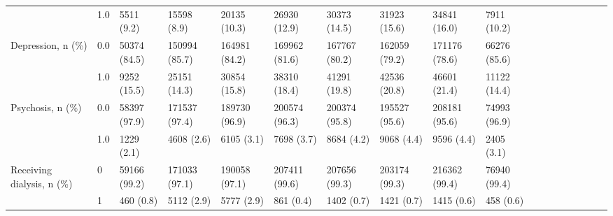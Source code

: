 \begin{tabular}{llllllllllllllllll}
                                       & 1.0 &                   5511 (9.2) &     15598 (8.9) &    20135 (10.3) &    26930 (12.9) &    30373 (14.5) &    31923 (15.6) &    34841 (16.0) &    7911 (10.2) &                   &                    &                    &                    &                    &                     &                     &                     \\
Depression, n (\%) & 0.0 &                 50374 (84.5) &   150994 (85.7) &   164981 (84.2) &   169962 (81.6) &   167767 (80.2) &   162059 (79.2) &   171176 (78.6) &   66276 (85.6) &                   &                    &                    &                    &                    &                     &                     &                     \\
                                       & 1.0 &                  9252 (15.5) &    25151 (14.3) &    30854 (15.8) &    38310 (18.4) &    41291 (19.8) &    42536 (20.8) &    46601 (21.4) &   11122 (14.4) &                   &                    &                    &                    &                    &                     &                     &                     \\
Psychosis, n (\%) & 0.0 &                 58397 (97.9) &   171537 (97.4) &   189730 (96.9) &   200574 (96.3) &   200374 (95.8) &   195527 (95.6) &   208181 (95.6) &   74993 (96.9) &                   &                    &                    &                    &                    &                     &                     &                     \\
                                       & 1.0 &                   1229 (2.1) &      4608 (2.6) &      6105 (3.1) &      7698 (3.7) &      8684 (4.2) &      9068 (4.4) &      9596 (4.4) &     2405 (3.1) &                   &                    &                    &                    &                    &                     &                     &                     \\
Receiving dialysis, n (\%) & 0 &                 59166 (99.2) &   171033 (97.1) &   190058 (97.1) &   207411 (99.6) &   207656 (99.3) &   203174 (99.3) &   216362 (99.4) &   76940 (99.4) &                   &                    &                    &                    &                    &                     &                     &                     \\
                                       & 1 &                    460 (0.8) &      5112 (2.9) &      5777 (2.9) &       861 (0.4) &      1402 (0.7) &      1421 (0.7) &      1415 (0.6) &      458 (0.6) &                   &                    &                    &                    &                    &                     &                     &                     \\

\end{tabular}
